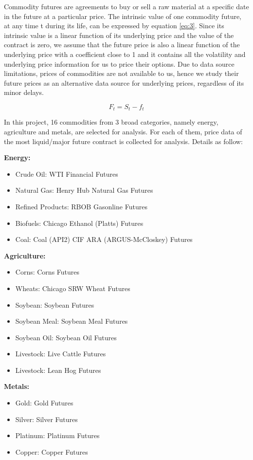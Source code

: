 \documentclass[10pt, a4paper, twocolumn]{article} %
\begin{document}
Commodity futures are agreements to buy or sell a raw material at a specific date in the future at a particular price. The intrinsic value of one commodity future, at any time t during its life, can be expressed by equation \ref{eq:3}. Since its intrinsic value is a linear function of its underlying price and the value of the contract is zero, we assume that the future price is also a linear function of the underlying price with a coefficient close to 1 and it contains all the volatility and underlying price information for us to price their options. Due to data source limitations, prices of commodities are not available to us, hence we study their future prices as an alternative data source for underlying prices, regardless of its minor delays.

\begin{equation} \label{eq:3}
F_t = S_t - f_t
\end{equation}

In this project, 16 commodities from 3 broad categories, namely energy, agriculture and metals, are selected for analysis. For each of them, price data of the most liquid/major future contract is collected for analysis. Details as follow:

\textbf{Energy:}
\begin{itemize}
\item Crude Oil: WTI Financial Futures
\item Natural Gas: Henry Hub Natural Gas Futures
\item Refined Products: RBOB Gasonline Futures
\item Biofuels: Chicago Ethanol (Platts) Futures
\item Coal: Coal (API2) CIF ARA (ARGUS-McCloskey) Futures
\end{itemize}

\textbf{Agriculture:}
\begin{itemize}
\item Corns: Corns Futures
\item Wheats: Chicago SRW Wheat Futures
\item Soybean: Soybean Futures
\item Soybean Meal: Soybean Meal Futures
\item Soybean Oil: Soybean Oil Futures
\item Livestock: Live Cattle Futures
\item Livestock: Lean Hog Futures
\end{itemize}

\textbf{Metals:}
\begin{itemize}
\item Gold: Gold Futures
\item Silver: Silver Futures
\item Platinum: Platinum Futures
\item Copper: Copper Futures
\end{itemize}
\end{document}
